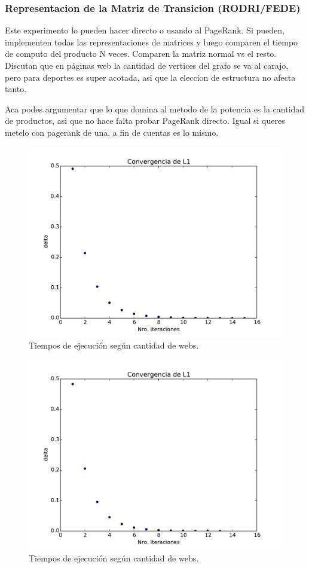\subsubsection{Representacion de la Matriz de Transicion (RODRI/FEDE)}
Este experimento lo pueden hacer directo o usando al PageRank. Si pueden, implementen todas las representaciones de matrices y luego comparen el tiempo de computo del producto N veces. Comparen la matriz normal vs el resto. Discutan que en páginas web la cantidad de vertices del grafo se va al carajo, pero para deportes es super acotada, asi que la eleccion de estructura no afecta tanto.

Aca podes argumentar que lo que domina al metodo de la potencia es la cantidad de productos, asi que no hace falta probar PageRank directo. Igual si queres metelo con pagerank de una, a fin de cuentas es lo mismo.

\begin{figure}[h]
\centering
\includegraphics[scale=0.7]{images/conv_2265.pdf}
\caption{Tiempos de ejecución según cantidad de webs.}
\label{timePageRank}
\end{figure}

\begin{figure}[h]
\centering
\includegraphics[scale=0.7]{images/conv_5000.pdf}
\caption{Tiempos de ejecución según cantidad de webs.}
\label{timePageRank}
\end{figure}
